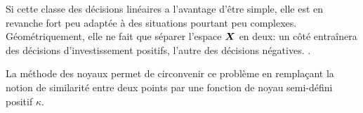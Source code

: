 Si cette classe des décisions linéaires a l'avantage d'être simple, elle est en revanche
fort peu adaptée à des situations pourtant peu complexes. Géométriquement, elle ne fait
que séparer l'espace $\bm{X}$ en deux: un côté entraînera des décisions d'investissement
positifs, l'autre des décisions négatives. .

La méthode des noyaux permet de circonvenir ce problème en remplaçant la notion de
similarité entre deux points par une fonction de noyau semi-défini positif $\kappa$.




